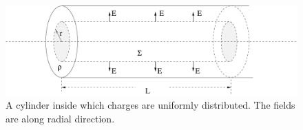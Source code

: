 \documentclass{esg8022pset}
\begin{document}
\begin{solution}
  \begin{figure}[ht]
    \begin{center}
      \includegraphics[width=12cm]{ps02_sol_05}
      \caption{A cylinder inside which charges are uniformly
      distributed. The fields are along radial direction.}
      \label{fig:cylinder3}
    \end{center}
  \end{figure}


\end{solution}
\end{document}
